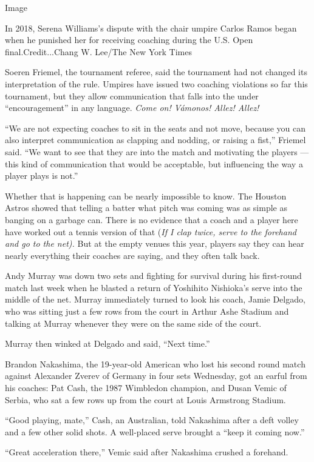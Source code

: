 Image

In 2018, Serena Williams's dispute with the chair umpire Carlos Ramos
began when he punished her for receiving coaching during the U.S. Open
final.Credit...Chang W. Lee/The New York Times

Soeren Friemel, the tournament referee, said the tournament had not
changed its interpretation of the rule. Umpires have issued two coaching
violations so far this tournament, but they allow communication that
falls into the under ``encouragement'' in any language. \emph{Come on!
Vámonos! Allez! Allez!}

``We are not expecting coaches to sit in the seats and not move, because
you can also interpret communication as clapping and nodding, or raising
a fist,'' Friemel said. ``We want to see that they are into the match
and motivating the players --- this kind of communication that would be
acceptable, but influencing the way a player plays is not.''

Whether that is happening can be nearly impossible to know. The Houston
Astros showed that telling a batter what pitch was coming was as simple
as banging on a garbage can. There is no evidence that a coach and a
player here have worked out a tennis version of that (\emph{If I clap
twice, serve to the forehand and go to the net).} But at the empty
venues this year, players say they can hear nearly everything their
coaches are saying, and they often talk back.

Andy Murray was down two sets and fighting for survival during his
first-round match last week when he blasted a return of Yoshihito
Nishioka's serve into the middle of the net. Murray immediately turned
to look his coach, Jamie Delgado, who was sitting just a few rows from
the court in Arthur Ashe Stadium and talking at Murray whenever they
were on the same side of the court.

Murray then winked at Delgado and said, ``Next time.''

Brandon Nakashima, the 19-year-old American who lost his second round
match against Alexander Zverev of Germany in four sets Wednesday, got an
earful from his coaches: Pat Cash, the 1987 Wimbledon champion, and
Dusan Vemic of Serbia, who sat a few rows up from the court at Louis
Armstrong Stadium.

``Good playing, mate,'' Cash, an Australian, told Nakashima after a deft
volley and a few other solid shots. A well-placed serve brought a ``keep
it coming now.''

``Great acceleration there,'' Vemic said after Nakashima crushed a
forehand.

